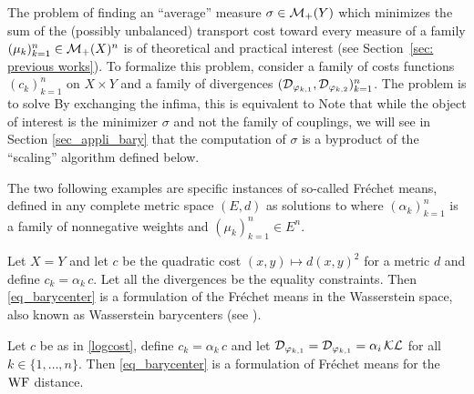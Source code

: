The problem of finding an ``average'' measure $\sigma \in \mathcal{M}_+(Y)$ which minimizes the sum of the (possibly unbalanced) transport cost toward every measure of a family $(\mu_k)_{k=1}^n \in \mathcal{M}_+(X)^n$ is of theoretical and practical interest (see Section~\ref{sec: previous works}). To formalize this problem, consider a family of costs functions $(c_k)_{k=1}^n $ on $X \times Y$ and a family of divergences $(\operatorname{\mathcal{D}}_{\varphi_{k,1}},\operatorname{\mathcal{D}}_{\varphi_{k,2}})_{k=1}^n$. The problem is to solve
%
By exchanging the infima, this is equivalent to
%
Note that while the object of interest is the minimizer $\sigma$ and not the family of couplings, we will see in Section \ref{sec_appli_bary} that the computation of $\sigma$ is a byproduct of the ``scaling'' algorithm defined below. 

The two following examples are specific instances of so-called Fr\'echet means, defined in any complete metric space $(E,d)$ as solutions to
where $(\alpha_k)_{k=1}^n$ is a family of nonnegative weights and $(\mu_k)_{k=1}^n\in E^n$.
%
\begin{example}
Let $X=Y$ and let $c$ be the quadratic cost $(x,y) \mapsto d(x,y)^2$ for a metric $d$ and define $c_k = \alpha_k \, c$. Let all the divergences be the equality constraints. Then \eqref{eq_barycenter} is a formulation of the Fr\'echet means in the Wasserstein space, also known as Wasserstein barycenters (see \cite{agueh2011barycenters}).
\end{example}

\begin{example}[$\WF$ barycenters]
Let  $c$ be as in \eqref{logcost}, define $c_k=\alpha_k \, c$ and let $\operatorname{\mathcal{D}}_{\varphi_{k,1}} = \operatorname{\mathcal{D}}_{\varphi_{k,1}}= \alpha_i \operatorname{\mathcal{KL}}$ for all $k\in \{1,\dots,n\}$. Then \eqref{eq_barycenter} is a formulation of Fr\'echet means for the $\WF$ distance.
\end{example}

